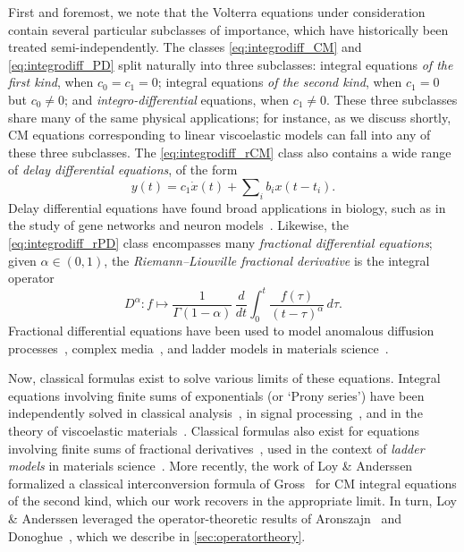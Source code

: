 \documentclass{cams-l} %
\theoremstyle{definition}
\theoremstyle{remark}
\numberwithin{equation}{section}
\begin{document}
First and foremost, we note that the Volterra equations under consideration contain several particular subclasses of importance, which have historically been treated semi-independently. The classes \ref{eq:integrodiff_CM} and \ref{eq:integrodiff_PD} split naturally into three subclasses: integral equations \emph{of the first kind}, when $c_0=c_1=0$; integral equations \emph{of the second kind}, when $c_1=0$ but $c_0\neq 0$; and \emph{integro-differential} equations, when $c_1 \neq 0$. These three subclasses share many of the same physical applications; for instance, as we discuss shortly, CM equations corresponding to linear viscoelastic models can fall into any of these three subclasses. The \ref{eq:integrodiff_rCM} class also contains a wide range of \emph{delay differential equations}, of the form
\[y(t) = c_1\dot{x}(t) + \sum\nolimits_i b_i x(t-t_i).\]
Delay differential equations have found broad applications in biology, such as in the study of gene networks and neuron models~\cite{rihan2021delay}. Likewise, the \ref{eq:integrodiff_rPD} class encompasses many \emph{fractional differential equations}; given $\alpha\in(0,1)$, the \emph{Riemann--Liouville fractional derivative} is the integral operator~\cite{2014fcip.book.....H}
\begin{equation}\label{eq:frac_deriv}
    D^\alpha:f\mapsto \frac{1}{\Gamma(1-\alpha)}\,\frac{d}{dt}\int_0^t\frac{f(\tau)}{(t-\tau)^\alpha}\,d\tau.
\end{equation}
Fractional differential equations have been used to model anomalous diffusion processes~\cite{2000PhR...339....1M}, complex media~\cite{2011ASAJ..130.2195H}, and ladder models in materials science~\cite{gross1956ladder,gross1956ladder2}.

Now, classical formulas exist to solve various limits of these equations. Integral equations involving finite sums of exponentials (or `Prony series') have been independently solved in classical analysis~\cite{whittaker1918numerical, polyanin2017integral}, in signal processing~\cite[Sec.~7.5]{kailath1980linear}, and in the theory of viscoelastic materials~\cite{gross1968mathematical, anderssen2006interconversion, loy2015interconversion, hristov2018linear, bhattacharya2023learning}. Classical formulas also exist for equations involving finite sums of fractional derivatives~\cite{mainardi2022fractional}, used in the context of \emph{ladder models} in materials science~\cite{gross1956ladder,gross1956ladder2}. More recently, the work of Loy \& Anderssen~\cite{loy_anderssen} formalized a classical interconversion formula of Gross~\cite{gross1968mathematical} for CM integral equations of the second kind, which our work recovers in the appropriate limit. In turn, Loy \& Anderssen leveraged the operator-theoretic results of Aronszajn~\cite{e48c169e-0374-3786-a618-5e3861c40257} and Donoghue~\cite{https://doi.org/10.1002/cpa.3160180402}, which we describe in \cref{sec:operatortheory}.
\end{document}
